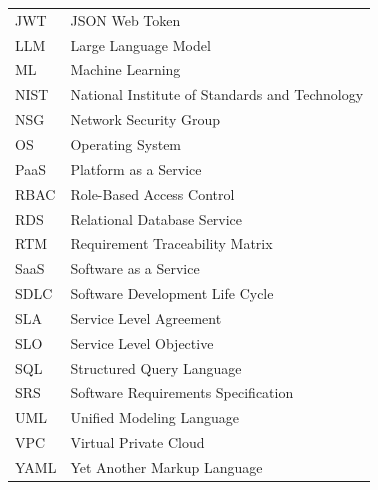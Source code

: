 \begin{center}
\begin{tabular}{l l}
JWT & JSON Web Token \\
LLM & Large Language Model \\
ML & Machine Learning \\
NIST & National Institute of Standards and Technology \\
NSG & Network Security Group \\
OS & Operating System \\
PaaS & Platform as a Service \\
RBAC & Role-Based Access Control \\
RDS & Relational Database Service \\
RTM & Requirement Traceability Matrix \\
SaaS & Software as a Service \\
SDLC & Software Development Life Cycle \\
SLA & Service Level Agreement \\
SLO & Service Level Objective \\
SQL & Structured Query Language \\
SRS & Software Requirements Specification \\
UML & Unified Modeling Language \\
VPC & Virtual Private Cloud \\
YAML & Yet Another Markup Language \\
\end{tabular}
\end{center}
